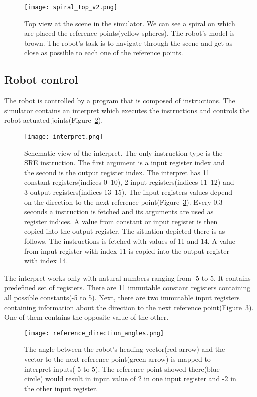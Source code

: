 \documentclass{ExcelAtFIT}
\begin{document}
\begin{figure}[t]
\centering
{\texttt{[image: spiral\_top\_v2.png]}}
\caption{Top view at the scene in the simulator.
We can see a spiral on which are placed the reference points(yellow spheres).
The robot's model is brown.
The robot's task is to navigate through the scene and get as close as possible to each one of the reference points.}
\label{fig:SpiralTop}
\end{figure}


\subsection{Robot control}
The robot is controlled by a program that is composed of instructions.
The simulator contains an interpret which executes the instructions and controls the robot actuated joints(Figure~\ref{fig:Interpret}).

\begin{figure}[t]
	\centering
	{\texttt{[image: interpret.png]}}
	\caption{
	Schematic view of the interpret.
	The only instruction type is the SRE instruction.
	The first argument is a input register index and the second is the output register index.
	The interpret has 11 constant registers(indices 0--10), 2 input registers(indices 11--12) and 3 output registers(indices 13--15).
	The input registers values depend on the direction to the next reference point(Figure~\ref{fig:ReferenceDirection}).
	Every 0.3 seconds a instruction is fetched and its arguments are used as register indices.
	A value from constant or input register is then copied into the output register.
	The situation depicted there is as follows.
	The instructions is fetched with values of 11 and 14.
	A value from input register with index 11 is copied into the output register with index 14.
	}
	\label{fig:Interpret}
\end{figure}

The interpret works only with natural numbers ranging from -5 to 5.
It contains predefined set of registers.
There are 11 immutable constant registers containing all possible constants(-5 to 5).
Next, there are two immutable input registers containing information about the direction to the next reference point(Figure~\ref{fig:ReferenceDirection}).
One of them contains the opposite value of the other.

\begin{figure}[t]
	\centering
	{\texttt{[image: reference\_direction\_angles.png]}}
	\caption{
		The angle between the robot's heading vector(red arrow) and the vector to the next reference point(green arrow) is mapped to interpret inputs(-5 to 5).
		The reference point showed there(blue circle) would result in input value of 2 in one input register and -2 in the other input register.
	}
	\label{fig:ReferenceDirection}
\end{figure}
\end{document}
